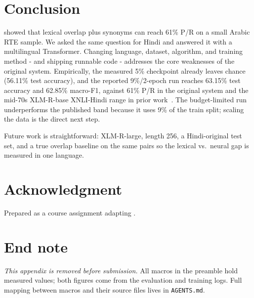 \documentclass[conference]{IEEEtran}
\newcommand{\TestAcc}{63.15\%}
\newcommand{\TestF}{62.85\%}
\begin{document}
\section{Conclusion}
\label{sec:conc}

\citet{khader2016textual} showed that lexical overlap plus synonyms can reach 61\% P/R on a small Arabic RTE sample. We asked the same question for Hindi and answered it with a multilingual Transformer. Changing language, dataset, algorithm, and training method - and shipping runnable code - addresses the core weaknesses of the original system. Empirically, the measured 5\% checkpoint already leaves chance (56.11\% test accuracy), and the reported 9\%/2-epoch run reaches \TestAcc{} test accuracy and \TestF{} macro-F1, against 61\% P/R in the original system and the mid-70s XLM-R-base XNLI-Hindi range in prior work~\citep{conneau2020xlmr}. The budget-limited run underperforms the published band because it uses 9\% of the train split; scaling the data is the direct next step.

Future work is straightforward: XLM-R-large, length 256, a Hindi-original test set, and a true overlap baseline on the same pairs so the lexical vs.\ neural gap is measured in one language.

\section*{Acknowledgment}
Prepared as a course assignment adapting \citet{khader2016textual}.

\appendices
\section*{End note}
\textit{This appendix is removed before submission.} All macros in the preamble hold measured values; both figures come from the evaluation and training logs. Full mapping between macros and their source files lives in \texttt{AGENTS.md}.



\end{document}
